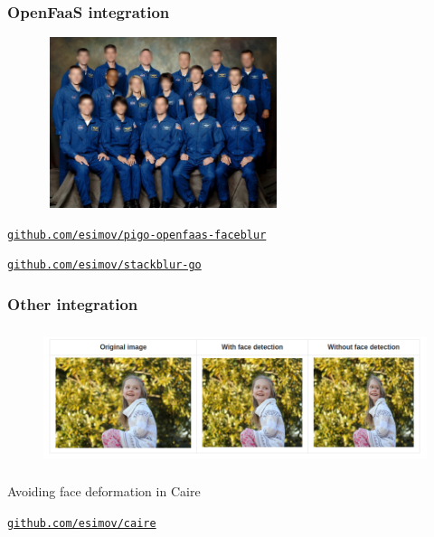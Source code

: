 \documentclass[9pt]{beamer}
\newcommand{\myblue} [1] {{\color{blue}#1}}
\begin{document}
\begin{frame}[fragile]
\frametitle{OpenFaaS integration}


\begin{figure}[h]
\begin{center}
\includegraphics[width=7cm,height=5cm]{assets/pigo_openfaas-blur_result.jpg}
\end{center}

\end{figure}

\myblue{\href{https://github.com/esimov/pigo-openfaas-faceblur}{\texttt{github.com/esimov/pigo-openfaas-faceblur}}}

\myblue{\href{https://github.com/esimov/stackblur-go}{\texttt{github.com/esimov/stackblur-go}}}


\end{frame}

\begin{frame}[fragile]
\frametitle{Other integration}


\begin{figure}[h]
\begin{center}
\includegraphics[width=12cm,height=4cm]{assets/caire-example.png}
\end{center}

\end{figure}

Avoiding face deformation in Caire


\myblue{\href{https://github.com/esimov/caire}{\texttt{github.com/esimov/caire}}}


\end{frame}
\end{document}
